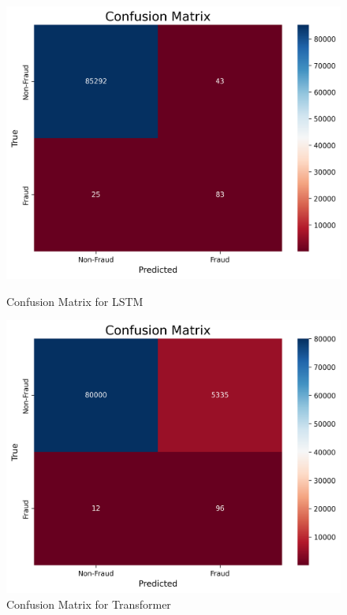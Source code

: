 \documentclass[11pt, oneside]{article}   	%
\begin{document}
\begin{figure}[H]
    \centering
    \begin{minipage}{0.49\textwidth}
        \centering
        \includegraphics[width=1.0\textwidth]{images/confusion_matrix_lstm.png}
        \caption{Confusion Matrix for LSTM}
        \label{fig:confusion_matrix_lstm}
    \end{minipage}\hfill
    \begin{minipage}{0.49\textwidth}
        \centering
        \includegraphics[width=1.0\textwidth]{images/confusion_matrix_transformer.png}
        \caption{Confusion Matrix for Transformer}
        \label{fig:confusion_matrix_transformer}
    \end{minipage}
\end{figure}
\end{document}
